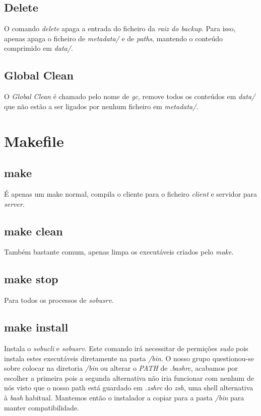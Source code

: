 \documentclass[12pt,a4paper]{report}
\begin{document}
\section{Delete}
O comando \emph{delete} apaga a entrada do ficheiro da \emph{raiz do backup}. Para isso, apenas apaga o ficheiro de \emph{metadata/} e de \emph{paths}, mantendo o conteúdo comprimido em \emph{data/}.

\section{Global Clean}
O \emph{Global Clean} é chamado pelo nome de \emph{gc}, remove todos os conteúdos em \emph{data/} que não estão a ser ligados por nenhum ficheiro em \emph{metadata/}.

\chapter{Makefile}
\section{make}
É apenas um make normal, compila o cliente para o ficheiro \emph{client} e servidor para \emph{server}.

\section{make clean}
Também bastante comum, apenas limpa os executáveis criados pelo \emph{make}.

\section{make stop}
Para todos os processos de \emph{sobusrv}.

\section{make install}
Instala o \emph{sobucli} e \emph{sobusrv}. Este comando irá necessitar de permições \emph{sudo} pois instala estes executáveis diretamente na pasta \emph{/bin}. O nosso grupo questionou-se sobre colocar na diretoria \emph{/bin} ou alterar o \emph{PATH} de \emph{.bashrc}, acabamos por escolher a primeira pois a segunda alternativa não iria funcionar com nenhum de nós visto que o nosso path está guardado em \emph{.zshrc} do \emph{zsh}, uma shell alternativa à \emph{bash} habitual. Mantemos então o instalador a copiar para a pasta \emph{/bin} para manter compatibilidade.
\end{document}

